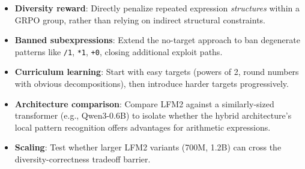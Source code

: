 \documentclass[11pt, letterpaper]{article}
\begin{document}
\begin{itemize}
    \item \textbf{Diversity reward}: Directly penalize repeated expression \emph{structures} within a GRPO group, rather than relying on indirect structural constraints.
    \item \textbf{Banned subexpressions}: Extend the no-target approach to ban degenerate patterns like \texttt{/1}, \texttt{*1}, \texttt{+0}, closing additional exploit paths.
    \item \textbf{Curriculum learning}: Start with easy targets (powers of 2, round numbers with obvious decompositions), then introduce harder targets progressively.
    \item \textbf{Architecture comparison}: Compare LFM2 against a similarly-sized transformer (e.g., Qwen3-0.6B) to isolate whether the hybrid architecture's local pattern recognition offers advantages for arithmetic expressions.
    \item \textbf{Scaling}: Test whether larger LFM2 variants (700M, 1.2B) can cross the diversity-correctness tradeoff barrier.
\end{itemize}

\printbibliography
\end{document}
